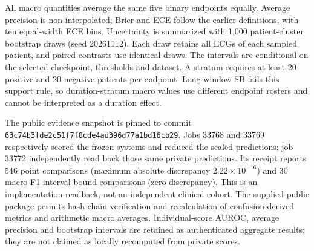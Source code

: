 All macro quantities average the same five binary endpoints equally. Average precision is non-interpolated; Brier and ECE follow the earlier definitions, with ten equal-width ECE bins. Uncertainty is summarized with 1,000 patient-cluster bootstrap draws (seed 20261112). Each draw retains all ECGs of each sampled patient, and paired contrasts use identical draws. The intervals are conditional on the selected checkpoint, thresholds and dataset. A stratum requires at least 20 positive and 20 negative patients per endpoint. Long-window SB fails this support rule, so duration-stratum macro values use different endpoint rosters and cannot be interpreted as a duration effect.

The public evidence snapshot is pinned to commit \texttt{63c74b3fde2c51f7f8cd}\allowbreak\texttt{e4ad396d77a1bd16cb29}. Jobs 33768 and 33769 respectively scored the frozen systems and reduced the sealed predictions; job 33772 independently read back those same private predictions. Its receipt reports 546 point comparisons (maximum absolute discrepancy $2.22\times10^{-16}$) and 30 macro-F1 interval-bound comparisons (zero discrepancy). This is an implementation readback, not an independent clinical cohort. The supplied public package permits hash-chain verification and recalculation of confusion-derived metrics and arithmetic macro averages. Individual-score AUROC, average precision and bootstrap intervals are retained as authenticated aggregate results; they are not claimed as locally recomputed from private scores.
